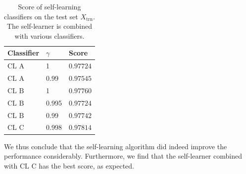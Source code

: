 \documentclass [a4paper] {report}
\begin{document}
	\begin{table}[H]
		\centering
		\caption{Score of self-learning classifiers on the test set $X_{\text{trn}}$. The self-learner is combined with various classifiers.}
		\label{tab:Xst_selfLearning}
		\begin{tabular}{ll|l}
			Classifier 		& $\gamma$ 	& Score  		\\ \hline
			$\text{CL A}$ 	& 1			& $0.97724$		\\
			$\text{CL A}$ 	& 0.99		& $0.97545$		\\
			$\text{CL B}$ 	& 1			& $0.97760$		\\
			$\text{CL B}$ 	& 0.995		& $0.97724$		\\
			$\text{CL B}$ 	& 0.99		& $0.97742$		\\
			$\text{CL C}$ 	& 0.998		& $0.97814$		\\
		\end{tabular}		
	\end{table}
	
	\noindent
	We thus conclude that the self-learning algorithm did indeed improve the performance considerably. Furthermore, we find that the self-learner combined with $\text{CL C}$ has the best score, as expected.  
	
\end{document}
